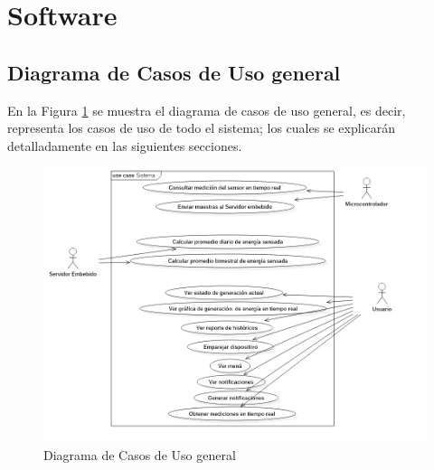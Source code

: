 \section{Software}

\subsection{Diagrama de Casos de Uso general}
En la Figura \ref{fig:dcu-general} se muestra el diagrama de casos de uso general, es decir, representa los casos de uso de todo el sistema; los cuales se explicarán detalladamente en las siguientes secciones.
\begin{figure}[H]
	\centering
	\includegraphics[scale=.56]{Capitulo4/software/submodulos/images/dcuGeneral.png}
	\caption{Diagrama de Casos de Uso general}
	\label{fig:dcu-general}
\end{figure}


